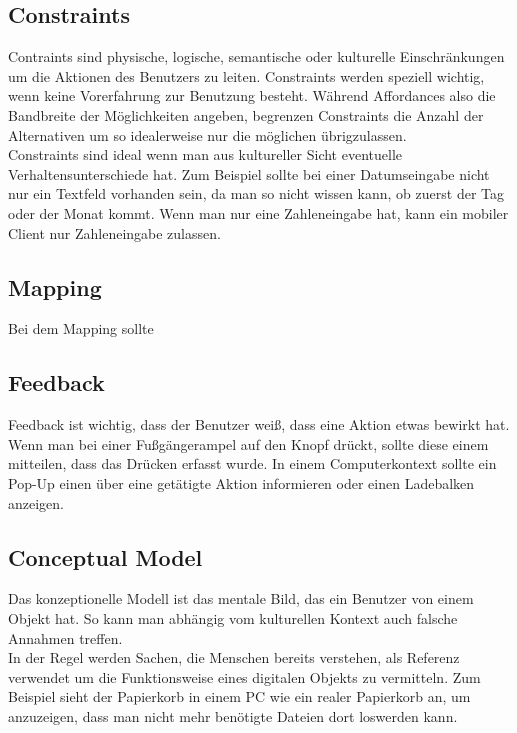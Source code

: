 \documentclass{article}
\begin{document}
\begin{itemize}
	\subsection{Constraints}
	Contraints sind physische, logische, semantische oder kulturelle Einschränkungen um die Aktionen des Benutzers zu leiten. Constraints werden speziell wichtig, wenn keine Vorerfahrung zur Benutzung besteht. Während Affordances also die Bandbreite der Möglichkeiten angeben, begrenzen Constraints die Anzahl der Alternativen um so idealerweise nur die möglichen übrigzulassen. \\
	Constraints sind ideal wenn man aus kultureller Sicht eventuelle Verhaltensunterschiede hat. Zum Beispiel sollte bei einer Datumseingabe nicht nur ein Textfeld vorhanden sein, da man so nicht wissen kann, ob zuerst der Tag oder der Monat kommt. Wenn man nur eine Zahleneingabe hat, kann ein mobiler Client nur Zahleneingabe zulassen.
	\subsection{Mapping}
	Bei dem Mapping sollte
	\subsection{Feedback}
	Feedback ist wichtig, dass der Benutzer weiß, dass eine Aktion etwas bewirkt hat. Wenn man bei einer Fußgängerampel auf den Knopf drückt, sollte diese einem mitteilen, dass das Drücken erfasst wurde. In einem Computerkontext sollte ein Pop-Up einen über eine getätigte Aktion informieren oder einen Ladebalken anzeigen.
	\subsection{Conceptual Model}
	Das konzeptionelle Modell ist das mentale Bild, das ein Benutzer von einem Objekt hat. So kann man abhängig vom kulturellen Kontext auch falsche Annahmen treffen. \\
	In der Regel werden Sachen, die Menschen bereits verstehen, als Referenz verwendet um die Funktionsweise eines digitalen Objekts zu vermitteln. Zum Beispiel sieht der Papierkorb in einem PC wie ein realer Papierkorb an, um anzuzeigen, dass man nicht mehr benötigte Dateien dort loswerden kann.

\end{itemize}
\end{document}
